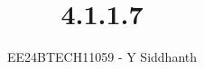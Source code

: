 \documentclass[journal]{IEEEtran}
\begin{document}
	
	
	\vspace{3cm}
	
	\title{4.1.1.7}
	\author{EE24BTECH11059 - Y Siddhanth}
	{\let\newpage\relax\maketitle}
	
	\renewcommand{\thefigure}{\theenumi}
	\renewcommand{\thetable}{\theenumi}
	\setlength{\intextsep}{10pt} %
	
	
	\renewcommand{\thetable}{\theenumi}
	
\end{document}
